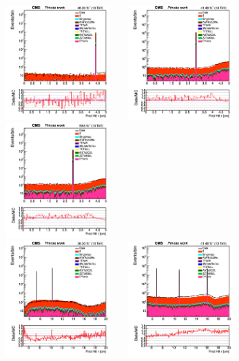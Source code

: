 \documentclass{cernatlasnote}
\begin{document}
  \begin{figure}[htp]
\centering
 \includegraphics[width=4.6cm, height=4.4cm]{images/emu_channel/2016/16_Plots_for_r_z/track_Track_firstHit_r_TRK_etaLT1p5_rLT5_Log.png}
\includegraphics[width=4.6cm, height=4.4cm]{images/emu_channel/2017/17_Plots_for_r_z/track_Track_firstHit_r_TRK_etaLT1p5_rLT5_Log.png}
 \includegraphics[width=4.6cm, height=4.4cm]{images/emu_channel/2018/18_Plots_for_r_z/track_Track_firstHit_r_TRK_etaLT1p5_rLT5_Log.png}\\
\includegraphics[width=4.6cm, height=4.4cm]{images/emu_channel/2016/16_Plots_for_r_z/track_Track_firstHit_r_TRK_etaLT1p5_r5T20_Log.png}
\includegraphics[width=4.6cm, height=4.4cm]{images/emu_channel/2017/17_Plots_for_r_z/track_Track_firstHit_r_TRK_etaLT1p5_r5T20_Log.png}

\end{figure}
\end{document}
